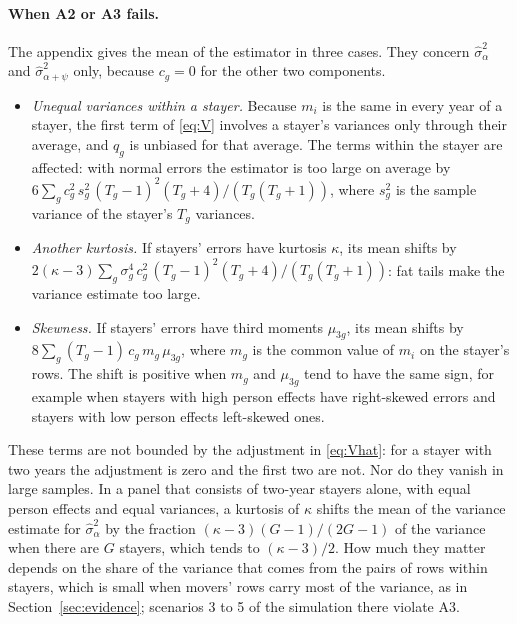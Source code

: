 \paragraph{When A2 or A3 fails.} The appendix gives the mean of the estimator in three cases. They concern
$\hat\sigma^2_\alpha$ and $\hat\sigma^2_{\alpha+\psi}$ only, because $c_g=0$ for the other two components.
\begin{itemize}
\item \emph{Unequal variances within a stayer.} Because $m_i$ is the same in every year of a stayer, the first
term of \eqref{eq:V} involves a stayer's variances only through their average, and $q_g$ is unbiased for that
average. The terms within the stayer are affected: with normal errors the estimator is too large on average by
$6\sum_gc_g^2\,s_g^2\,(T_g-1)^2(T_g+4)/(T_g(T_g+1))$, where $s_g^2$ is the sample variance of the stayer's $T_g$
variances.
\item \emph{Another kurtosis.} If stayers' errors have kurtosis $\kappa$, its mean shifts by
$2(\kappa-3)\sum_g\sigma_g^4\,c_g^2\,(T_g-1)^2(T_g+4)/(T_g(T_g+1))$: fat tails make the variance estimate too
large.
\item \emph{Skewness.} If stayers' errors have third moments $\mu_{3g}$, its mean shifts by
$8\sum_g(T_g-1)\,c_g\,m_g\,\mu_{3g}$, where $m_g$ is the common value of $m_i$ on the stayer's rows. The shift is
positive when $m_g$ and $\mu_{3g}$ tend to have the same sign, for example when stayers with high person
effects have right-skewed errors and stayers with low person effects left-skewed ones.
\end{itemize}
These terms are not bounded by the adjustment in \eqref{eq:Vhat}: for a stayer with two years the adjustment
is zero and the first two are not. Nor do they vanish in large samples. In a panel that consists of two-year
stayers alone, with equal person effects and equal variances, a kurtosis of $\kappa$ shifts the mean of the variance estimate for
$\hat\sigma^2_\alpha$ by the fraction $(\kappa-3)(G-1)/(2G-1)$ of the variance when there are $G$ stayers,
which tends to $(\kappa-3)/2$. How much
they matter depends on the share of the variance that comes from the pairs of rows within stayers, which is
small when movers' rows carry most of the variance, as in Section~\ref{sec:evidence}; scenarios 3 to 5 of the
simulation there violate A3.

